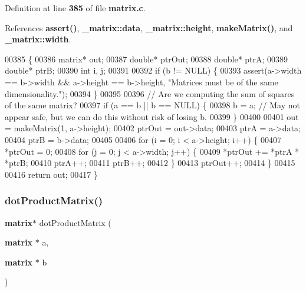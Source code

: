 Definition at line \textbf{ 385} of file \textbf{ matrix.\+c}.



References \textbf{ assert()}, \textbf{ \+\_\+matrix\+::data}, \textbf{ \+\_\+matrix\+::height}, \textbf{ make\+Matrix()}, and \textbf{ \+\_\+matrix\+::width}.


\begin{DoxyCode}
00385                                                 \{
00386     matrix* out;
00387     \textcolor{keywordtype}{double}* ptrOut;
00388     \textcolor{keywordtype}{double}* ptrA;
00389     \textcolor{keywordtype}{double}* ptrB;
00390     \textcolor{keywordtype}{int} i, j;
00391 
00392     \textcolor{keywordflow}{if} (b != NULL) \{
00393         assert(a->width == b->width && a->height == b->height, \textcolor{stringliteral}{"Matrices must be of the same
       dimensionality."});
00394     \}
00395 
00396     \textcolor{comment}{// Are we computing the sum of squares of the same matrix?}
00397     \textcolor{keywordflow}{if} (a == b || b == NULL) \{
00398         b = a; \textcolor{comment}{// May not appear safe, but we can do this without risk of losing b.}
00399     \}
00400 
00401     out = makeMatrix(1, a->height);
00402     ptrOut = out->data;
00403     ptrA = a->data;
00404     ptrB = b->data;
00405 
00406     \textcolor{keywordflow}{for} (i = 0; i < a->height; i++) \{
00407         *ptrOut = 0;
00408         \textcolor{keywordflow}{for} (j = 0; j < a->width; j++) \{
00409             *ptrOut += *ptrA * *ptrB;
00410             ptrA++;
00411             ptrB++;
00412         \}
00413         ptrOut++;
00414     \}
00415 
00416     \textcolor{keywordflow}{return} out;
00417 \}
\end{DoxyCode}
\mbox{\label{matrix_8h_a0b568a64e81a56779c2141b424475976}} 
\subsubsection{dot\+Product\+Matrix()}
{\footnotesize\ttfamily \textbf{ matrix}$\ast$ dot\+Product\+Matrix (\begin{DoxyParamCaption}\item[{\textbf{ matrix} $\ast$}]{a,  }\item[{\textbf{ matrix} $\ast$}]{b }\end{DoxyParamCaption})}



